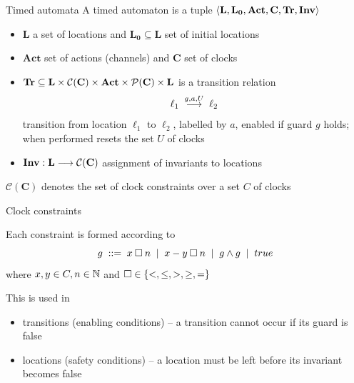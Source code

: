 \documentclass{beamer}
\def\cc#1{\mathcal{C}(#1)}
\begin{document}
\begin{slide}{Timed automata}
\small
A timed automaton is a tuple
$\mathopen{\langle}\mathbf{L}, \mathbf{L_0}, \mathbf{Act}, \mathbf{C}, \mathbf{Tr}, 
\mathbf{Inv}\mathclose{\rangle}$ 
\begin{itemize}
     \item $\mathbf{L}$ a set of locations and 
             $\mathbf{L_0} \subseteq \mathbf{L}$ set
        of \alert{initial} locations
\item $\mathbf{Act}$ set of actions (\alert{channels}) 
        and $\mathbf{C}$ set of clocks
     \item
             $\mathbf{Tr} \subseteq \mathbf{L} 
             \times \cc{\mathbf{C}} \times \mathbf{Act} 
             \times \pow{(\mathbf{C})} \times \mathbf{L}$
     is a \alert{transition} relation
\begin{equation*}
  \ell_1\; \stackrel{g,a,U}{\longrightarrow}\;  \ell_2
\end{equation*}
transition from location $\ell_1$ to $\ell_2$, labelled by $a$, enabled if
\alert{guard} $g$ holds; when performed resets the set $U$ of clocks
\item $\fdec{\mathbf{Inv}}{\mathbf{L}}{\cc{\mathbf{C}}}$ assignment of invariants to
  locations
\end{itemize}
$\cc{\mathbf{C}}$ denotes the set of clock constraints over a set $C$ of
clocks
\end{slide}

\begin{slide}{Clock constraints}

Each constraint is formed according to 
\begin{equation*}
  g \; ::=\; x \mathbin{\square} n \; \mid\; x - y \mathbin{\square} n  \; \mid\; g \mathbin{\wedge} g \;\mid\; true
\end{equation*}
where $x,y \in C, n \in \mathbb{N}$ and $\square \in \mathopen{ \{ }<,\leq,>,\geq,=\mathclose{ \} }$

This is used in
\begin{itemize}
\item transitions (enabling conditions) -- a transition cannot occur
  if its guard is false
\item locations (safety conditions) -- a location must be left before
  its invariant becomes false
\end{itemize}

\end{slide}
\end{document}
